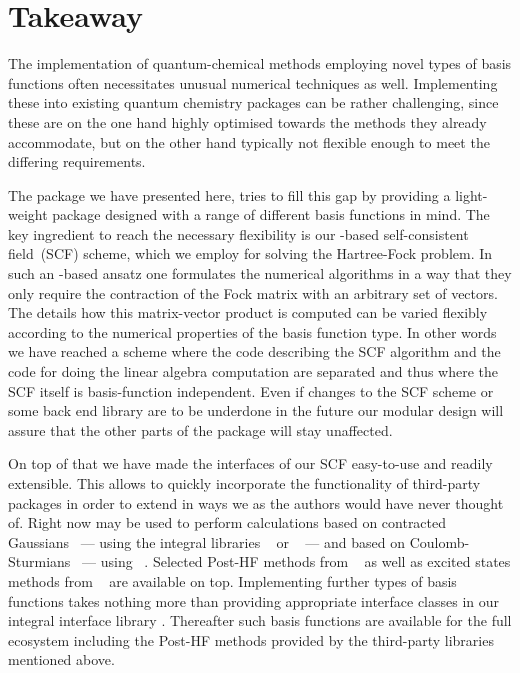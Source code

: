 \section{Takeaway}

The implementation of quantum-chemical methods
employing novel types of basis functions often necessitates
unusual numerical techniques as well.
Implementing these into existing quantum chemistry packages
can be rather challenging,
since these are on the one hand highly optimised towards the methods
they already accommodate,
but on the other hand typically not flexible enough
to meet the differing requirements.

The \molsturm package we have presented here,
tries to fill this gap
by providing a light-weight package designed with a range of different
basis functions in mind.
The key ingredient to reach the necessary flexibility
is our \contraction-based self-consistent field~(SCF) scheme,
which we employ for solving the Hartree-Fock problem.
In such an \contraction-based ansatz one formulates
the numerical algorithms in a way that they only require the
contraction of the Fock matrix with an arbitrary set of vectors.
The details how this matrix-vector product is computed
can be varied flexibly according to the numerical properties
of the basis function type.
In other words we have reached a scheme where the code describing
the SCF algorithm and the code for doing the linear algebra
computation are separated
and thus where the SCF itself is basis-function independent.
Even if changes to the SCF scheme or some back end
library are to be underdone in the future our modular design
will assure that the other parts of the \molsturm package will stay
unaffected.

On top of that we have made the interfaces
of our SCF easy-to-use and readily extensible.
This allows to quickly incorporate the functionality
of third-party packages in order to extend \molsturm in ways we as the authors
would have never thought of.
Right now \molsturm may be used to perform
calculations based on contracted Gaussians~\cite{Hehre1969} --- using
the integral libraries \libint~\cite{Libint2_231,Libint2}
or \libcint~\cite{Sun2015} --- and based on
Coulomb-Sturmians~\cite{Shull1959,Avery2011} ---
using \sturmint~\cite{sturmintWeb}.
Selected Post-HF methods from \pyscf~\cite{Sun2017} as well as
excited states methods from \adcman~\cite{Wormit2014} are available on top.
Implementing further types of basis functions
takes nothing more than providing appropriate interface classes in
our integral interface library \gint.
Thereafter such basis functions are available for the full \molsturm ecosystem
including the Post-HF methods
provided by the third-party libraries mentioned above.

